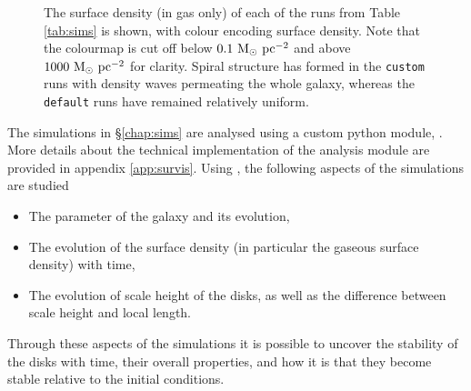 \begin{figure}[!ht]
    \leavevmode\rlap{\usebox{\graphicsbox}}%
    \begin{minipage}[b]{0.63\wd\graphicsbox}%
        \caption{The surface density (in gas only) of each of the runs from Table \ref{tab:sims} is shown, with colour encoding surface density. Note that the colourmap is cut off below $0.1 ~\mathrm{M}_{\odot} ~\mathrm{pc}^{-2}$ and above $1000 ~\mathrm{M}_{\odot} ~\mathrm{pc}^{-2}$ for clarity. Spiral structure has formed in the {\tt custom} runs with density waves permeating the whole galaxy, whereas the {\tt default} runs have remained relatively uniform.}
        \label{fig:toomqsimbigfig}
    \end{minipage}\hspace*{0.33\wd\graphicsbox}%
\end{figure}

The simulations in \S\ref{chap:sims} are analysed using a custom python module, \sv. 
More details about the technical implementation of the analysis module are provided in appendix \ref{app:survis}.
Using \sv, the following aspects of the simulations are studied
\begin{itemize}
\item The \citet{toomre_on_1964} parameter of the galaxy and its evolution,
\item The evolution of the surface density (in particular the gaseous surface density) with time,
\item The evolution of scale height of the disks, as well as the difference between scale height and local \citet{jeans_stability_1902} length.
\end{itemize}
Through these aspects of the simulations it is possible to uncover the stability of the disks with time, their overall properties, and how it is that they become stable relative to the initial conditions.


